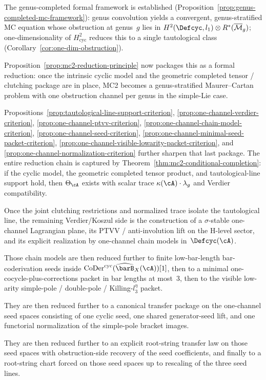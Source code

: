 \begin{remark}
The genus-completed formal framework is established
(Proposition~\ref{prop:genus-completed-mc-framework}): genus
convolution yields a convergent, genus-stratified MC equation
whose obstruction at genus~$g$ lies in
$H^2(\Defcyc,l_1)\otimes R^*(\overline{\mathcal{M}}_g)$;
one-dimensionality of $H^2_{\mathrm{cyc}}$ reduces this to a
single tautological class
(Corollary~\ref{cor:one-dim-obstruction}).

Proposition~\ref{prop:mc2-reduction-principle} now packages this as a
formal reduction: once the intrinsic cyclic model and the geometric
completed tensor / clutching package are in place, MC2 becomes a
genus-stratified Maurer--Cartan problem with one obstruction channel
per genus in the simple-Lie case.

Propositions~\ref{prop:tautological-line-support-criterion},
\ref{prop:one-channel-verdier-criterion},
\ref{prop:one-channel-ptvv-criterion},
\ref{prop:one-channel-chain-model-criterion},
\ref{prop:one-channel-seed-criterion},
\ref{prop:one-channel-minimal-seed-packet-criterion},
\ref{prop:one-channel-visible-lowarity-packet-criterion}, and
\ref{prop:one-channel-normalization-criterion} further sharpen that
last package.  The entire reduction chain is captured by
Theorem~\ref{thm:mc2-conditional-completion}: if the cyclic model,
the geometric completed tensor product, and tautological-line support
hold, then $\Theta_{\cA}$ exists with scalar trace
$\kappa(\cA)\cdot\lambda_g$ and Verdier compatibility.

Once the joint clutching restrictions and normalized trace isolate the
tautological line, the remaining Verdier/Koszul side is the construction
of a $\sigma$-stable one-channel Lagrangian plane, its PTVV /
anti-involution lift on the H-level sector, and its explicit
realization by one-channel chain models in~$\Defcyc(\cA)$.

Those chain models are then reduced further to finite low-bar-length
bar-coderivation seeds inside
$\operatorname{CoDer}^{\mathrm{cyc}}(\widehat{\barB}_X(\cA))[1]$, then
to a minimal one-cocycle-plus-corrections packet in bar lengths at
most~$3$, then to the visible low-arity simple-pole / double-pole /
Killing-$l_3^\eta$ packet.

They are then reduced further to a canonical transfer package on
the one-channel seed spaces consisting of one cyclic seed, one shared
generator-seed lift, and one functorial normalization of the
simple-pole bracket images.

They are then reduced further to an explicit root-string transfer law
on those seed spaces with obstruction-side recovery of the
seed coefficients, and finally to a root-string chart forced on those
seed spaces up to rescaling of the three seed lines.


\end{remark}

